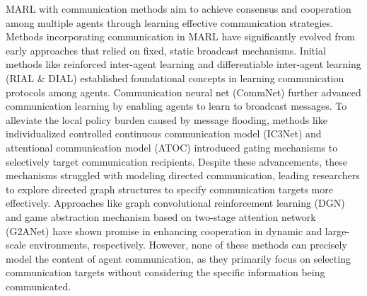 MARL with communication methods aim to achieve consensus and cooperation among multiple agents through learning effective communication strategies. Methods incorporating communication in MARL have significantly evolved from early approaches that relied on fixed, static broadcast mechanisms. Initial methods like reinforced inter-agent learning and differentiable inter-agent learning (RIAL \& DIAL) \cite{foerster2016learning} established foundational concepts in learning communication protocols among agents. Communication neural net (CommNet) \cite{sukhbaatar2016learning} further advanced communication learning by enabling agents to learn to broadcast messages. To alleviate the local policy burden caused by message flooding, methods like individualized controlled continuous communication model (IC3Net) \cite{singh2018learning} and attentional communication model (ATOC) \cite{jiang2018learning} introduced gating mechanisms to selectively target communication recipients. Despite these advancements, these mechanisms struggled with modeling directed communication, leading researchers to explore directed graph structures to specify communication targets more effectively. Approaches like graph convolutional reinforcement learning (DGN) \cite{jiang2018graph} and game abstraction mechanism based on two-stage attention network (G2ANet) \cite{liu2020multi} have shown promise in enhancing cooperation in dynamic and large-scale environments, respectively. However, none of these methods can precisely model the content of agent communication, as they primarily focus on selecting communication targets without considering the specific information being communicated. 

